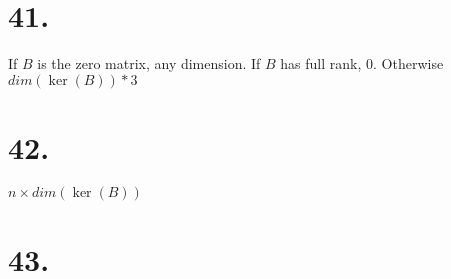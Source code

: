 \documentclass[]{article}
\begin{document}
\hypertarget{section-37}{%
\section{41.}\label{section-37}}

If \(B\) is the zero matrix, any dimension. If \(B\) has full rank, 0.
Otherwise \(dim(\ker(B))*3\)

\hypertarget{section-38}{%
\section{42.}\label{section-38}}

\(n \times dim(\ker(B))\)

\hypertarget{section-39}{%
\section{43.}\label{section-39}}
\end{document}
